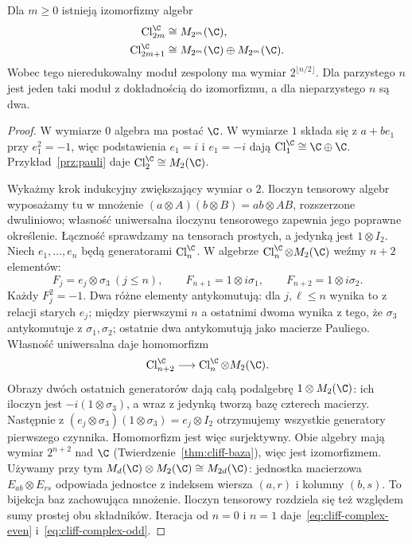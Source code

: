\begin{twierdzenie}
\label{thm:cliff-kompleks}
Dla $m\geq0$ istnieją izomorfizmy algebr
\begin{align}
 \operatorname{Cl}^{\C}_{2m}
   &\cong M_{2^m}(\C), \label{eq:cliff-complex-even}\\
 \operatorname{Cl}^{\C}_{2m+1}
   &\cong M_{2^m}(\C)\oplus M_{2^m}(\C).
   \label{eq:cliff-complex-odd}
\end{align}
Wobec tego nieredukowalny moduł zespolony
ma wymiar $2^{\lfloor n/2\rfloor}$.
Dla parzystego $n$ jest jeden taki moduł
z dokładnością do izomorfizmu, a dla
nieparzystego $n$ są dwa.
\end{twierdzenie}
\begin{proof}
W wymiarze $0$ algebra ma postać $\C$.
W wymiarze $1$ składa się z $a+be_1$ przy
$e_1^2=-1$, więc podstawienia $e_1=i$
i $e_1=-i$ dają
$\operatorname{Cl}^{\C}_1\cong\C\oplus\C$.
Przykład~\ref{prz:pauli} daje
$\operatorname{Cl}^{\C}_2\cong M_2(\C)$.

Wykażmy krok indukcyjny zwiększający wymiar o $2$.
Iloczyn tensorowy algebr wyposażamy tu w mnożenie
$(a\otimes A)(b\otimes B)=ab\otimes AB$, rozszerzone
dwuliniowo; własność uniwersalna iloczynu tensorowego zapewnia
jego poprawne określenie. Łączność sprawdzamy na tensorach
prostych, a jedynką jest $1\otimes I_2$.
Niech $e_1,\ldots,e_n$ będą generatorami
$\operatorname{Cl}^{\C}_n$. W algebrze
$\operatorname{Cl}^{\C}_n\otimes M_2(\C)$
weźmy $n+2$ elementów:
\[
 F_j=e_j\otimes\sigma_3\ (j\leq n),\qquad
 F_{n+1}=1\otimes i\sigma_1,\qquad
 F_{n+2}=1\otimes i\sigma_2.
\]
Każdy $F_j^2=-1$. Dwa różne elementy
antykomutują: dla $j,\ell\leq n$ wynika
to z relacji starych $e_j$; między pierwszymi
$n$ a ostatnimi dwoma wynika z tego, że
$\sigma_3$ antykomutuje z $\sigma_1,\sigma_2$;
ostatnie dwa antykomutują jako macierze Pauliego.
Własność uniwersalna daje homomorfizm
\[
 \operatorname{Cl}^{\C}_{n+2}
    \longrightarrow
   \operatorname{Cl}^{\C}_n\otimes M_2(\C).
\]
Obrazy dwóch ostatnich generatorów dają całą
podalgebrę $1\otimes M_2(\C)$:
ich iloczyn jest $-i(1\otimes\sigma_3)$,
a wraz z jedynką tworzą bazę czterech macierzy.
Następnie z
$(e_j\otimes\sigma_3)(1\otimes\sigma_3)
=e_j\otimes I_2$ otrzymujemy wszystkie
generatory pierwszego czynnika. Homomorfizm
jest więc surjektywny. Obie algebry mają
wymiar $2^{n+2}$ nad $\C$
(Twierdzenie~\ref{thm:cliff-baza}),
więc jest izomorfizmem. Używamy przy tym
$M_d(\C)\otimes M_2(\C)\cong M_{2d}(\C)$:
jednostka macierzowa $E_{ab}\otimes E_{rs}$ odpowiada
jednostce z indeksem wiersza $(a,r)$ i kolumny $(b,s)$.
To bijekcja baz zachowująca mnożenie. Iloczyn tensorowy
rozdziela się też względem sumy prostej obu składników.
Iteracja od $n=0$
i $n=1$ daje~\eqref{eq:cliff-complex-even}
i~\eqref{eq:cliff-complex-odd}.


\end{proof}
